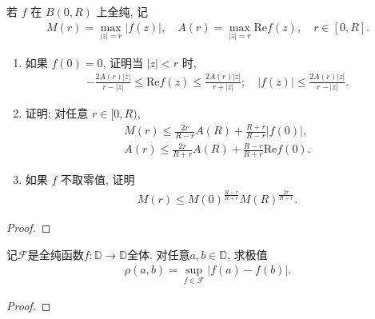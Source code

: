 \documentclass[../../main.tex]{subfiles}%
\begin{document}
\begin{theorem}\label{theorem:Borel-Carathéodory 定理}
若 $f$ 在 $B(0,R)$ 上全纯, 记
\begin{align*}
M(r) = \max\limits_{|z|=r} |f(z)|, \quad A(r) = \max\limits_{|z|=r} \mathrm{Re}f(z), \quad r \in [0,R].
\end{align*}
\begin{enumerate}[(1)]
\item 如果 $f(0) = 0$, 证明当 $|z| < r$ 时,
\begin{align*}
-\frac{2A(r)|z|}{r - |z|} \leqslant \mathrm{Re}f(z) \leqslant \frac{2A(r)|z|}{r + |z|}; \quad |f(z)| \leqslant \frac{2A(r)|z|}{r - |z|}.
\end{align*}

\item 证明: 对任意 $r \in [0,R)$,
\begin{align*}
M(r) \leqslant \frac{2r}{R - r}A(R) + \frac{R + r}{R - r}|f(0)|, \\
A(r) \leqslant \frac{2r}{R + r}A(R) + \frac{R - r}{R + r}\mathrm{Re}f(0).
\end{align*}
\item 如果 $f$ 不取零值, 证明
\begin{align*}
M(r) \leqslant M(0)^{\frac{R-r}{R+r}} M(R)^{\frac{2r}{R+r}}.
\end{align*}
\end{enumerate}
\end{theorem}
\begin{proof}


\end{proof}

\begin{example}
记$\mathscr{F}$是全纯函数$f:\mathbb{D} \to \mathbb{D}$全体. 对任意$a,b \in \mathbb{D}$, 求极值
\begin{align*}
\rho(a,b) = \sup\limits_{f \in \mathscr{F}} |f(a) - f(b)|.
\end{align*}
\end{example}
\begin{proof}



\end{proof}
\end{document}
